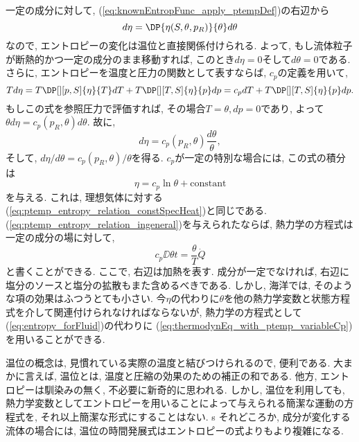 一定の成分に対して, (\ref{eq:knownEntropFunc_apply_ptempDef})の右辺から
\begin{equation}
  d\eta = \DP{\eta(S,\theta,p_R)}{\theta} d\theta
\end{equation}
なので, エントロピーの変化は温位と直接関係付けられる. 
よって, もし流体粒子が断熱的かつ一定の成分のまま移動すれば, 
このとき$d\eta=0$そして$d\theta =0$である. 
さらに, エントロピーを温度と圧力の関数として表すならば, 
$c_p$の定義を用いて, 
\begin{equation}
 Td\eta = T\DP[][p,S]{\eta}{T} dT + T\DP[][T,S]{\eta}{p} dp
  = c_p dT + T\DP[][T,S]{\eta}{p} dp. 
\end{equation}
もしこの式を参照圧力で評価すれば, その場合$T=\theta, dp=0$であり, 
よって$\theta d\eta = c_p(p_R,\theta) d\theta$. 
故に, 
\begin{equation}
  \boxed{
   d\eta = c_p(p_R,\theta) \dfrac{d\theta}{\theta}, 
   \label{eq:ptemp_entropy_relation_ingeneral}
  }
\end{equation}
そして, $d\eta/d\theta = c_p(p_R,\theta) /\theta$を得る. 
$c_p$が一定の特別な場合には, この式の積分は
\begin{equation}
 \eta = c_p \ln{\theta} + \text{constant}
\end{equation}
を与える. 
これは, 理想気体に対する(\ref{eq:ptemp_entropy_relation_constSpecHeat})と同じである. 
(\ref{eq:ptemp_entropy_relation_ingeneral})を与えられたならば, 
熱力学の方程式は一定の成分の場に対して, 
\begin{equation}
 c_p \DD{\theta}{t} = \dfrac{\theta}{T} \dot{Q}
 \label{eq:thermodynEq_with_ptemp_variableCp}
\end{equation}
と書くことができる. 
ここで, 右辺は加熱を表す. 
成分が一定でなければ, 右辺に塩分のソースと塩分の拡散もまた含めるべきである. 
しかし, 海洋では, そのような項の効果はふつうとても小さい. 
今$\eta$の代わりに$\theta$を他の熱力学変数と状態方程式を介して関連付けられなければならないが, 
熱力学の方程式として(\ref{eq:entropy_forFluid})の代わりに
(\ref{eq:thermodynEq_with_ptemp_variableCp})を用いることができる. 

温位の概念は, 見慣れている実際の温度と結びつけられるので, 便利である. 
大まかに言えば, 温位とは, 温度と圧縮の効果のための補正の和である. 
他方, エントロピーは馴染みの無く, 不必要に新奇的に思われる. 
しかし, 温位を利用しても, 
熱力学変数としてエントロピーを用いることによって与えられる簡潔な運動の方程式を, 
それ以上簡潔な形式にすることはない. s
それどころか, 成分が変化する流体の場合には, 温位の時間発展式はエントロピーの式よりもより複雑になる. 

